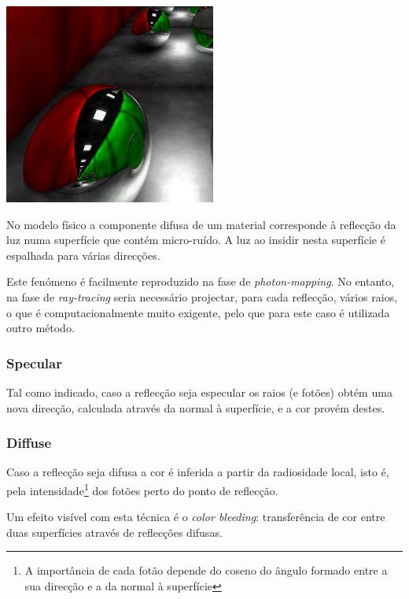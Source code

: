 \documentclass[a4paper]{article}
\begin{document}
\begin{center}
	\includegraphics[scale=0.50]{images/reflection.png}
	\label{fig:reflection}
\end{center}

\indent No modelo físico a componente difusa de um material corresponde à reflecção da luz numa superfície
que contém micro-ruído. A luz ao insidir nesta superfície é espalhada para várias direcções. 

\indent Este fenómeno é facilmente reproduzido na fase de \emph{photon-mapping}.
No entanto, na fase de \emph{ray-tracing} seria necessário projectar, para cada reflecção, vários raios, o que
é computacionalmente muito exigente, pelo que para este caso é utilizada outro método.

\subsubsection{Specular}
\indent \indent Tal como indicado, caso a reflecção seja especular os raios (e fotões) obtém uma nova direcção,
calculada através da normal à superfície, e a cor provém destes. 

\subsubsection{Diffuse}
\indent Caso a reflecção seja difusa a cor é inferida a partir da radiosidade local,
isto é, pela intensidade\footnote[1]{A importância de cada fotão depende do coseno do ângulo formado entre a sua direcção e a da normal à superfície} dos fotões perto do ponto de reflecção.

\indent Um efeito visível com esta técnica é o \emph{color bleeding}: transferência de cor entre duas superfícies
através de reflecções difusas.

\cleardoublepage
\end{document}
